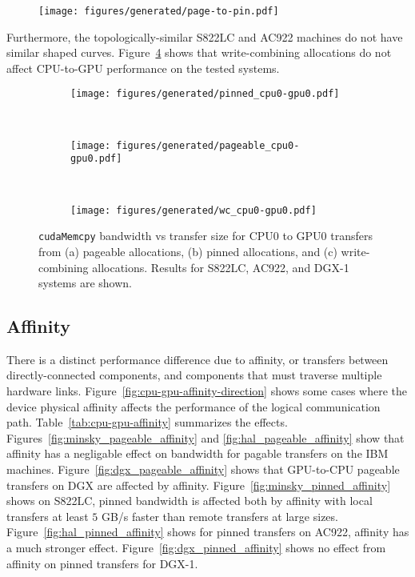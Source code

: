 
\begin{figure}[ht]
    \centering
    \texttt{[image: figures/generated/page-to-pin.pdf]}
    \caption[]{}
    \label{fig:explicit-pageable-cpu}
\end{figure}

Furthermore, the topologically-similar S822LC and AC922 machines do not have similar shaped curves.
Figure~\ref{fig:wc-cpu0-gpu0} shows that write-combining allocations do not affect CPU-to-GPU performance on the tested systems.


\begin{figure}[ht]
    \centering
    \begin{subfigure}[b]{0.3\textwidth}
        \texttt{[image: figures/generated/pinned\_cpu0-gpu0.pdf]}
        \caption{}
        \label{fig:pinned-cpu0-gpu0}
    \end{subfigure}
    ~
    \begin{subfigure}[b]{0.3\textwidth}
        \texttt{[image: figures/generated/pageable\_cpu0-gpu0.pdf]}
        \caption{}
        \label{fig:pageable-cpu0-gpu0}
    \end{subfigure}
    ~
    \begin{subfigure}[b]{0.3\textwidth}
        \texttt{[image: figures/generated/wc\_cpu0-gpu0.pdf]}
        \caption{}
        \label{fig:wc-cpu0-gpu0}
    \end{subfigure}
    \caption[]{
        \texttt{cudaMemcpy} bandwidth vs transfer size for CPU0 to GPU0 transfers from 
        (a) pageable allocations,
        (b) pinned allocations, and
        (c) write-combining allocations.
        Results for S822LC, AC922, and DGX-1 systems are shown.
    }
    \label{fig:pageable-pinned-wc}
\end{figure}

\subsection{Affinity}
\label{sec:explicit-cpu-gpu-affinity}

There is a distinct performance difference due to affinity, or transfers between directly-connected components, and components that must traverse multiple hardware links.
Figure~\ref{fig:cpu-gpu-affinity-direction} shows some cases where the device physical affinity affects the performance of the logical communication path.
Table~\ref{tab:cpu-gpu-affinity} summarizes the effects.
Figures~\ref{fig:minsky_pageable_affinity} and \ref{fig:hal_pageable_affinity} show that affinity has a negligable effect on bandwidth for pagable transfers on the IBM machines.
Figure~\ref{fig:dgx_pageable_affinity} shows that GPU-to-CPU pageable transfers on DGX are affected by affinity.
Figure~\ref{fig:minsky_pinned_affinity} shows on S822LC, pinned bandwidth is affected both by affinity with local transfers at least $5$ GB/s faster than remote transfers at large sizes.
Figure~\ref{fig:hal_pinned_affinity} shows for pinned transfers on AC922, affinity has a much stronger effect.
Figure~\ref{fig:dgx_pinned_affinity} shows no effect from affinity on pinned transfers for DGX-1.

